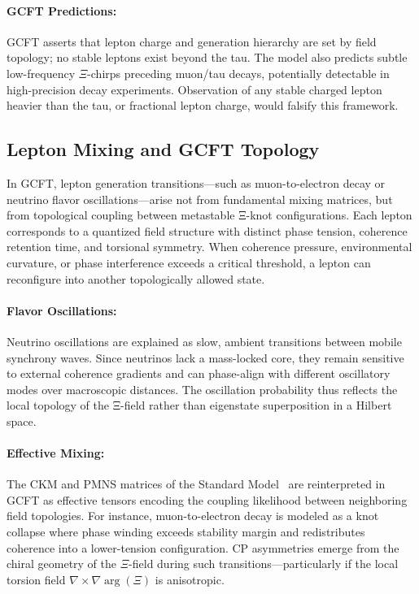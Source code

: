 \paragraph{GCFT Predictions:}
GCFT asserts that lepton charge and generation hierarchy are set by field topology; no stable leptons exist beyond the tau. The model also predicts subtle low-frequency $\Xi$-chirps preceding muon/tau decays, potentially detectable in high-precision decay experiments. Observation of any stable charged lepton heavier than the tau, or fractional lepton charge, would falsify this framework.

\subsection{Lepton Mixing and GCFT Topology}
\label{sec:lepton_mixing}

In GCFT, lepton generation transitions---such as muon-to-electron decay or neutrino flavor oscillations---arise not from fundamental mixing matrices, but from topological coupling between metastable Ξ-knot configurations. Each lepton corresponds to a quantized field structure with distinct phase tension, coherence retention time, and torsional symmetry. When coherence pressure, environmental curvature, or phase interference exceeds a critical threshold, a lepton can reconfigure into another topologically allowed state.

\paragraph{Flavor Oscillations:}
Neutrino oscillations are explained as slow, ambient transitions between mobile synchrony waves. Since neutrinos lack a mass-locked core, they remain sensitive to external coherence gradients and can phase-align with different oscillatory modes over macroscopic distances. The oscillation probability thus reflects the local topology of the Ξ-field rather than eigenstate superposition in a Hilbert space.

\paragraph{Effective Mixing:}
The CKM and PMNS matrices of the Standard Model~\cite{Pontecorvo1968} are reinterpreted in GCFT as effective tensors encoding the coupling likelihood between neighboring field topologies. For instance, muon-to-electron decay is modeled as a knot collapse where phase winding exceeds stability margin and redistributes coherence into a lower-tension configuration. CP asymmetries emerge from the chiral geometry of the $\Xi$-field during such transitions---particularly if the local torsion field $\nabla \times \nabla \arg(\Xi)$ is anisotropic.

